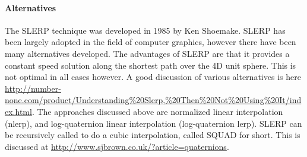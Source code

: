 \documentclass[12pt]{article}
\begin{document}
\paragraph{Alternatives}
The SLERP technique was developed in 1985 by Ken Shoemake. \cite{SHOEMAKE} SLERP has been 
largely adopted in the field of computer graphics, however there have been many alternatives 
developed.  The advantages of SLERP are that it provides a constant speed solution 
along the shortest path over the 4D unit sphere.  This is not optimal in all cases however.
A good discussion of various alternatives is here \url{http://number-none.com/product/Understanding%20Slerp,%20Then%20Not%20Using%20It/index.html}. 
The approaches discussed above are normalized linear interpolation (nlerp), and 
log-quaternion linear interpolation (log-quaternion lerp). 
SLERP can be recursively called to do a cubic interpolation, called SQUAD for short.  
This is discussed at \url{http://www.sjbrown.co.uk/?article=quaternions}.






\printindex
\end{document}
